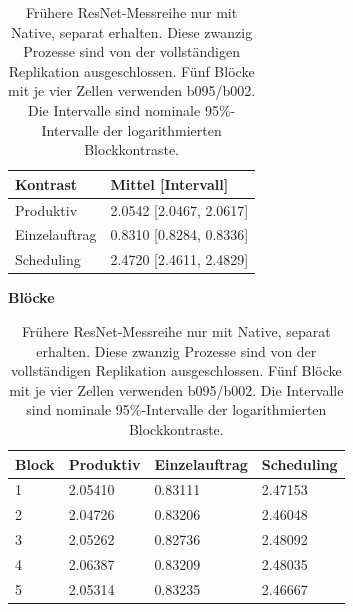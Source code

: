 \begin{table}[t]
\centering
\caption{Frühere ResNet-Messreihe nur mit Native, separat erhalten. Diese zwanzig Prozesse sind von der vollständigen Replikation ausgeschlossen. Fünf Blöcke mit je vier Zellen verwenden b095/b002. Die Intervalle sind nominale 95\%-Intervalle der logarithmierten Blockkontraste.}
\label{tab:supp-scheduling-native-only}
\begingroup\small\setlength{\tabcolsep}{3pt}
\begin{tabular}{ll}
\toprule
Kontrast & Mittel [Intervall] \\
\midrule
Produktiv & 2.0542 [2.0467, 2.0617] \\
Einzelauftrag & 0.8310 [0.8284, 0.8336] \\
Scheduling & 2.4720 [2.4611, 2.4829] \\
\bottomrule
\end{tabular}
\par\smallskip\textbf{Blöcke}\par\smallskip
\begin{tabular}{llll}
\toprule
Block & Produktiv & Einzelauftrag & Scheduling \\
\midrule
1 & 2.05410 & 0.83111 & 2.47153 \\
2 & 2.04726 & 0.83206 & 2.46048 \\
3 & 2.05262 & 0.82736 & 2.48092 \\
4 & 2.06387 & 0.83209 & 2.48035 \\
5 & 2.05314 & 0.83235 & 2.46667 \\
\bottomrule
\end{tabular}
\endgroup
\end{table}
